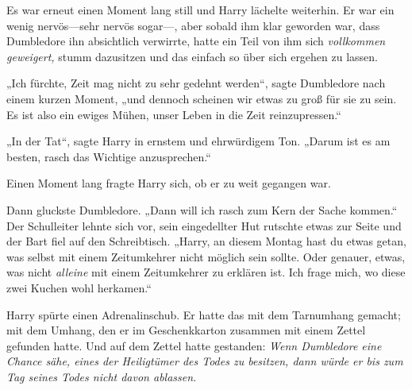 Es war erneut einen Moment lang still und Harry lächelte weiterhin. Er war ein wenig nervös—sehr nervös sogar—, aber sobald ihm klar geworden war, dass Dumbledore ihn absichtlich verwirrte, hatte ein Teil von ihm sich \emph{vollkommen geweigert,} stumm dazusitzen und das einfach so über sich ergehen zu lassen.

„Ich fürchte, Zeit mag nicht zu sehr gedehnt werden“, sagte Dumbledore nach einem kurzen Moment, „und dennoch scheinen wir etwas zu groß für sie zu sein. Es ist also ein ewiges Mühen, unser Leben in die Zeit reinzupressen.“

„In der Tat“, sagte Harry in ernstem und ehrwürdigem Ton. „Darum ist es am besten, rasch das Wichtige anzusprechen.“

Einen Moment lang fragte Harry sich, ob er zu weit gegangen war.

Dann gluckste Dumbledore. „Dann will ich rasch zum Kern der Sache kommen.“ Der Schulleiter lehnte sich vor, sein eingedellter Hut rutschte etwas zur Seite und der Bart fiel auf den Schreibtisch. „Harry, an diesem Montag hast du etwas getan, was selbst mit einem Zeitumkehrer nicht möglich sein sollte. Oder genauer, etwas, was nicht \emph{alleine} mit einem Zeitumkehrer zu erklären ist. Ich frage mich, wo diese zwei Kuchen wohl herkamen.“

Harry spürte einen Adrenalinschub. Er hatte das mit dem Tarnumhang gemacht; mit dem Umhang, den er im Geschenkkarton zusammen mit einem Zettel gefunden hatte. Und auf dem Zettel hatte gestanden: \emph{Wenn Dumbledore eine Chance sähe, eines der Heiligtümer des Todes zu besitzen, dann würde er bis zum Tag seines Todes nicht davon ablassen.}

